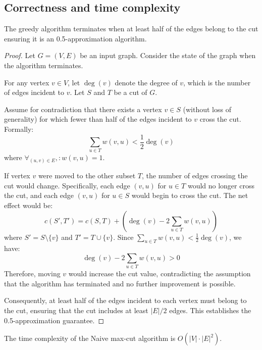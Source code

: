 \subsection{Correctness and time complexity}

\begin{theorem}
     The greedy algorithm terminates when at least half of the edges belong to the cut ensuring it is an 0.5-approximation algorithm.
\end{theorem}

\begin{proof}
    Let \( G = (V, E) \) be an input graph. Consider the state of the graph when the algorithm terminates.

    For any vertex \( v \in V \), let \( \deg(v) \) denote the degree of \( v \), which is the number of edges incident to \( v \). Let \( S \) and \( T \) be a cut of \(G\).

    Assume for contradiction that there exists a vertex \( v \in S \) (without loss of generality) for which fewer than half of the edges incident to \( v \) cross the cut. Formally:
    \[
    \sum_{u \in T} w(v, u) < \frac{1}{2} \deg(v)
    \]
    where \( \forall_{(u, v) \in E}, \colon w(v, u) = 1\).

    If vertex \( v \) were moved to the other subset \( T \), the number of edges crossing the cut would change. Specifically, each edge \( (v, u) \) for \( u \in T \) would no longer cross the cut, and each edge \( (v, u) \) for \( u \in S \) would begin to cross the cut. The net effect would be:
    \[
    c(S', T') = c(S, T) + \left( \deg(v) - 2 \sum_{u \in T} w(v, u) \right)
    \]
    where \(S' = S \setminus \{v\}\) and \(T' = T \cup \{v\}  \).
    Since \( \sum_{u \in T} w(v, u) < \frac{1}{2} \deg(v) \), we have:
    \[
    \deg(v) - 2 \sum_{u \in T} w(v, u) > 0
    \]
    Therefore, moving \( v \) would increase the cut value, contradicting the assumption that the algorithm has terminated and no further improvement is possible.

    Consequently, at least half of the edges incident to each vertex must belong to the cut, ensuring that the cut includes at least \( |E|/2 \) edges. This establishes the 0.5-approximation guarantee.
\end{proof}

\begin{theorem}
    The time complexity of the Naive max-cut algorithm is \(O(|V| \cdot |E|^2)\).
\end{theorem}

